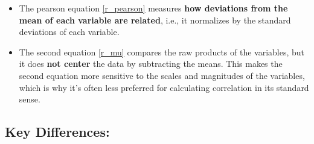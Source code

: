 \documentclass[
  12 pt,
  a4paper,
]{book}
\providecommand{\tightlist}{%
  \setlength{\itemsep}{0pt}\setlength{\parskip}{0pt}}
\numberwithin{equation}{section}
\theoremstyle{plain}      %
\theoremstyle{definition} %
\theoremstyle{remark}     %
\theoremstyle{note}         %
\begin{document}
\begin{itemize}
\tightlist
\item
  The pearson equation \ref{r_pearson} measures \textbf{how deviations
  from the mean of each variable are related}, i.e., it normalizes by
  the standard deviations of each variable.
\item
  The second equation \ref{r_mu} compares the raw products of the
  variables, but it does \textbf{not center} the data by subtracting the
  means. This makes the second equation more sensitive to the scales and
  magnitudes of the variables, which is why it's often less preferred
  for calculating correlation in its standard sense.
\end{itemize}

\hypertarget{key-differences}{%
\subsection{Key Differences:}\label{key-differences}}
\end{document}
